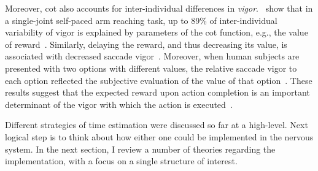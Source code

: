 Moreover, \gls{cot} also accounts for inter-individual differences in \emph{vigor}\!{}.\footnotemark\
 show that in a single-joint self-paced arm reaching task, up to 89\% of inter-individual variability of vigor is explained by parameters of the \gls{cot} function, e.g., the value of reward~\cite{Berret2018SciReports}.
Similarly, delaying the reward, and thus decreasing its value, is associated with decreased saccade vigor~\cite{Shadmehr2010Jneurosci}.
Moreover, when human subjects are presented with two options with different values, the relative saccade vigor to each option reflected the subjective evaluation of the value of that option~\cite{Reppert2015JNeurosci}.
These results suggest that the expected reward upon action completion is an important determinant of the vigor with which the action is executed~\cite[see][for a review]{Shadmehr2019TINS}.
\par
Different strategies of time estimation were discussed so far at a high-level.
Next logical step is to think about how either one could be implemented in the nervous system.
In the next section, I review a number of theories regarding the implementation, with a focus on a single structure of interest.